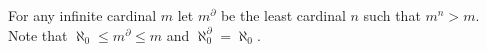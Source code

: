 For any infinite cardinal $m$ let $m^\partial$ be the least cardinal $n$ such that $m^n > m$. Note that $\aleph_0 \leq m^\partial \leq m$ and $\aleph_0^\partial = \aleph_0$.
